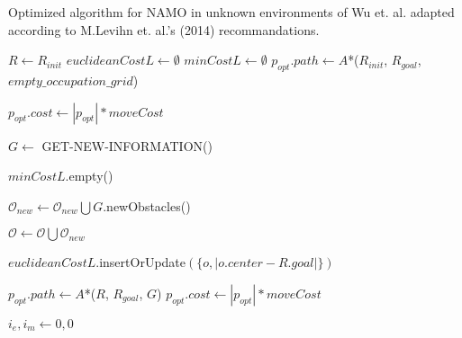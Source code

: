 \begin{algorithm}[H]

  \caption{Optimized algorithm for NAMO in unknown environments of Wu et. al. adapted according to M.Levihn et. al.'s (2014) recommandations.}

  \label{alg:namoue_augmented}

  \begin{algorithmic}[1]


        \State $R \gets R_{init}$
        \State $euclideanCostL \gets \emptyset$
        \State $minCostL \gets \emptyset$
        \State $p_{opt}.path \gets A$*($R_{init}$, $R_{goal}$, $empty\_occupation\_grid$)

        \State $p_{opt}.cost \gets |p_{opt}| * moveCost$


        \State $G \gets $ GET-NEW-INFORMATION()

          \State $minCostL$.empty()
        \EndIf

        \State $\mathcal{O}_{new} \gets \mathcal{O}_{new} \bigcup G.$newObstacles()


            \State $\mathcal{O} \gets \mathcal{O} \bigcup \mathcal{O}_{new}$

              \State $euclideanCostL$.insertOrUpdate$(\{o, |o.center - R.goal|\})$
            \EndFor

            \State $p_{opt}.path \gets A$*($R$, $R_{goal}$, $G$)
            \State $p_{opt}.cost \gets |p_{opt}| * moveCost$

            \State $i_{e}, i_{m} \gets 0 , 0$


\end{algorithmic}
\end{algorithm}
